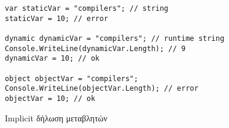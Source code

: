 \begin{listing}[htbp]
\begin{verbatim}
var staticVar = "compilers"; // string
staticVar = 10; // error

dynamic dynamicVar = "compilers"; // runtime string
Console.WriteLine(dynamicVar.Length); // 9
dynamicVar = 10; // ok

object objectVar = "compilers";
Console.WriteLine(objectVar.Length); // error
objectVar = 10; // ok
\end{verbatim}
\caption{Implicit δήλωση μεταβλητών}
\label{implicitDeclaration}
\end{listing}